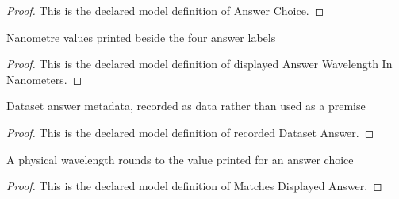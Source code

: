 \begin{proof}
  This is the declared model definition of Answer Choice.
\end{proof}
\begin{definition}
  \label{def:physics:phyx-mini-0245:phyxminiproblems-problemphyxmini0245-displayedanswerwavelengthinnanometers}
  Nanometre values printed beside the four answer labels
\end{definition}
\begin{proof}
  This is the declared model definition of displayed Answer Wavelength In Nanometers.
\end{proof}
\begin{definition}
  \label{def:physics:phyx-mini-0245:phyxminiproblems-problemphyxmini0245-recordeddatasetanswer}
  Dataset answer metadata, recorded as data rather than used as a premise
\end{definition}
\begin{proof}
  This is the declared model definition of recorded Dataset Answer.
\end{proof}
\begin{definition}
  \label{def:physics:phyx-mini-0245:phyxminiproblems-problemphyxmini0245-matchesdisplayedanswer}
  A physical wavelength rounds to the value printed for an answer choice
\end{definition}
\begin{proof}
  This is the declared model definition of Matches Displayed Answer.
\end{proof}
